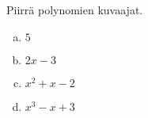 %
%
%
%
%
%
%
%
%

\Harjoitustehtavat

\begin{tehtava}
    Piirrä polynomien kuvaajat.
    \begin{enumerate}[a)]
        \item $5$
        \item $2x-3$
        \item $x^2+x-2$
        \item $x^3-x+3$
    \end{enumerate}   
    \begin{vastaus}
    	\item \begin{kuvaajapohja}{0.4}{-4}{4}{-1}{7}
			  \end{kuvaajapohja}
    	\item \begin{kuvaajapohja}{0.4}{-4}{4}{-5}{3}
			  \end{kuvaajapohja}
		\item \begin{kuvaajapohja}{0.4}{-4}{4}{-3}{5}
			  \end{kuvaajapohja}
		\item \begin{kuvaajapohja}{0.4}{-4}{4}{-3}{5}
			  \end{kuvaajapohja}
    \end{vastaus}
\end{tehtava}

